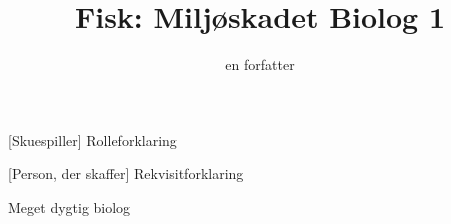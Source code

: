 \documentclass[a4paper,11pt]{article}
\title{Fisk: Miljøskadet Biolog 1}
\author{en forfatter}
\begin{document}
\maketitle

\begin{roles}
    [Skuespiller] Rolleforklaring
\end{roles}

\begin{props}
    [Person, der skaffer] Rekvisitforklaring
\end{props}


\begin{sketch}

\scene Meget dygtig biolog

\end{sketch}
\end{document}
